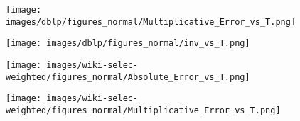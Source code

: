 \begin{figure*}[htbp]
\begin{subfigure}[b]{\textwidth}
\begin{minipage}[b]{0.3\textwidth}
	\end{minipage}%
	\begin{minipage}[b]{0.3\textwidth}
		\centering
		
		\texttt{[image: images/dblp/figures\_normal/Multiplicative\_Error\_vs\_T.png]} %
		
	\end{minipage}%
	\begin{minipage}[b]{0.3\textwidth}
		\centering
		\texttt{[image: images/dblp/figures\_normal/inv\_vs\_T.png]} %
	\end{minipage}
\end{subfigure}

\begin{subfigure}{\textwidth}
	\centering
	\begin{minipage}[b]{0.05\textwidth}
		\centering
	\end{minipage}%
	\begin{minipage}[b]{0.3\textwidth}
		\centering
		\texttt{[image: images/wiki-selec-weighted/figures\_normal/Absolute\_Error\_vs\_T.png]} %
		
	\end{minipage}%
	\begin{minipage}[b]{0.3\textwidth}
		\centering
		
		\texttt{[image: images/wiki-selec-weighted/figures\_normal/Multiplicative\_Error\_vs\_T.png]} %
		
	\end{minipage}%
	\begin{minipage}[b]{0.3\textwidth}
		\centering
		

\end{minipage}
\end{subfigure}
\end{figure*}
